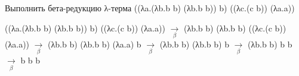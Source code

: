 
\begin{problem}
Выполнить бета-редукцию λ-терма ((λa.(λb.b b) (λb.b b)) b) ((λc.(c b)) (λa.a))
\end{problem}
\begin{solution}
((λa.(λb.b b) (λb.b b)) b) ((λc.(c b)) (λa.a)) $\underset{\beta}{\longrightarrow}$ (λb.b b) (λb.b b) ((λc.(c b)) (λa.a)) $\underset{\beta}{\longrightarrow}$ 
(λb.b b) (λb.b b) (λa.a) b $\underset{\beta}{\longrightarrow}$ (λb.b b) (λb.b b) b $\underset{\beta}{\longrightarrow}$ (λb.b b) b b $\underset{\beta}{\longrightarrow}$ b b b
\end{solution}
